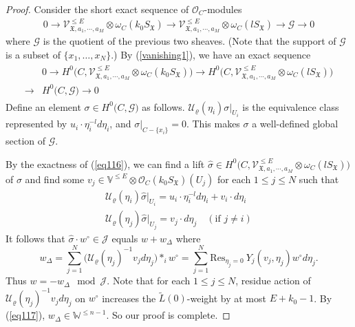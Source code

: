 \documentclass[11pt,b5paper,notitlepage]{article}
\theoremstyle{definition}
\theoremstyle{plain}
\newcommand{\mc}{\mathcal}
\newcommand{\wtd}{\widetilde}
\newcommand{\wht}{\widehat}
\newcommand{\Res}{\mathrm{Res}}
\newcommand{\SV}{\mathscr{V}}
\newcommand{\scr}{\mathscr}
\newcommand{\Vbb}{\mathbb V}
\newcommand{\Wbb}{\mathbb W}
\newcommand{\<}{\left\langle}
\renewcommand{\>}{\right\rangle}
\newcommand{\MO}{\mathcal{O}}
\newcommand{\MU}{\mathcal{U}}
\newcommand{\fx}{\mathfrak{X}}
\newcommand{\SJ}{\mathscr{J}}
\numberwithin{equation}{section}
\begin{document}
\begin{proof}
Consider the short exact sequence of $\MO_C$-modules
\begin{gather}
    0\rightarrow \SV_{\fx,a_1,\cdots,a_M}^{\leq E}\otimes \omega_C(k_0S_\fx)\rightarrow \SV_{\fx,a_1,\cdots,a_M}^{\leq E} \otimes \omega_C(lS_\fx)\rightarrow \mathscr{G}\rightarrow 0
\end{gather}
    where $\mathscr{G}$ is the quotient of the previous two sheaves. (Note that the support of $\scr G$ is a subset of $\{x_1,\dots,x_N\}$.) By (\ref{vanishing1}), we have an exact sequence
\begin{align}\label{eq116}
\begin{aligned}
&0\rightarrow H^0\big(C,\SV_{\fx,a_1,\cdots,a_M}^{\leq E}\otimes \omega_C(k_0S_\fx)\big)\rightarrow H^0\big(C,\SV_{\fx,a_1,\cdots,a_M}^{\leq E} \otimes \omega_C(lS_\fx)\big)\\
\rightarrow & H^0\big(C,\mathscr{G}\big)\rightarrow 0
\end{aligned}
\end{align}
Define an element $\sigma\in H^0\big(C,\mathscr{G}\big)$ as follows. $\mc U_\varrho(\eta_i)\sigma\vert_{U_i}$ is the equivalence class represented by $u_i\cdot \eta_i^{-l}d\eta_i$, and $\sigma\vert_{C-\{x_i\}}=0$. This makes $\sigma$ a well-defined global section of $\scr G$. 




     
By the exactness of (\ref{eq116}), we can find a lift $\wht{\sigma}\in H^0\big(C,\SV_{\fx,a_1,\cdots,a_M}^{\leq E} \otimes \omega_C(lS_\fx)\big)$ of $\sigma$ and find some $v_j\in \Vbb^{\leq E}\otimes \MO_C(k_0S_\fx)(U_j)$ for each $1\leq j\leq N$ such that
\begin{subequations}
\begin{gather}
        \mc U_\varrho(\eta_i)\wht{\sigma}\vert_{U_i}=u_i\cdot \eta_i^{-l}d\eta_i+v_i\cdot d\eta_i\\
        \mc U_\varrho(\eta_j)\wht{\sigma}\vert_{U_j}=v_j\cdot d\eta_j\quad (\text{if }j\ne i)
\end{gather}
\end{subequations}
It follows that $\wht{\sigma}\cdot w^\circ\in \SJ$ equals $w+w_\Delta$ where 
    $$
    w_\Delta=\sum_{j=1}^N \big(\mc U_\varrho(\eta_j)^{-1}v_jd\eta_j\big)*_i w^\circ=\sum_{j=1}^N\Res_{\eta_j=0}~ Y_j(v_j,\eta_j)w^\circ d\eta_j.
    $$
    Thus $w=-w_\Delta\mod \SJ$. Note that for each $1\leq j\leq N$, residue action of $\mc U_\varrho(\eta_j)^{-1}v_jd\eta_j$ on $w^\circ$ increases the $\wtd L(0)$-weight by at most $E+k_0-1$. By (\ref{eq117}), $w_\Delta\in \Wbb^{\leq n-1}$. So our proof is complete.
\end{proof}
\end{document}
